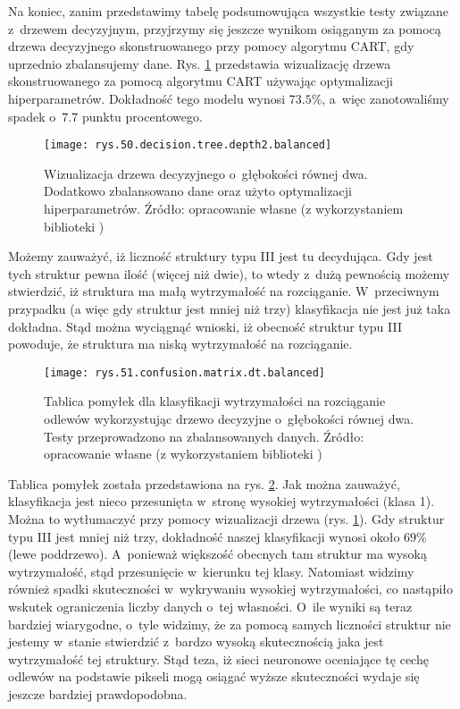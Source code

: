 Na koniec, zanim przedstawimy tabelę podsumowująca wszystkie testy związane z~drzewem decyzyjnym, przyjrzymy się jeszcze wynikom osiąganym za pomocą drzewa decyzyjnego skonstruowanego przy pomocy algorytmu CART, gdy uprzednio zbalansujemy dane. 
Rys. \ref{rys.50.decision.tree.depth2.balanced} przedstawia wizualizację drzewa skonstruowanego za pomocą algorytmu CART używając optymalizacji hiperparametrów. Dokładność tego modelu wynosi $73.5\%$, a~więc zanotowaliśmy spadek o~$7.7$ punktu procentowego. 
\begin{figure}[h]
    \centering
    \texttt{[image: rys.50.decision.tree.depth2.balanced]}
    \caption{Wizualizacja drzewa decyzyjnego o~głębokości równej dwa. Dodatkowo zbalansowano dane oraz użyto optymalizacji hiperparametrów. Źródło: opracowanie własne (z wykorzystaniem biblioteki )}
    \label{rys.50.decision.tree.depth2.balanced}
\end{figure}
Możemy zauważyć, iż liczność struktury typu III jest tu decydująca. Gdy jest tych struktur pewna ilość (więcej niż dwie), to wtedy z~dużą pewnością możemy stwierdzić, iż struktura ma małą wytrzymałość na rozciąganie. W~przeciwnym przypadku (a więc gdy struktur jest mniej niż trzy) klasyfikacja nie jest już taka dokładna. Stąd można wyciągnąć wnioski, iż obecność struktur typu III powoduje, że struktura ma niską wytrzymałość na rozciąganie.
\begin{figure}[h]
    \centering
    \texttt{[image: rys.51.confusion.matrix.dt.balanced]}
    \caption{Tablica pomyłek dla klasyfikacji wytrzymałości na rozciąganie odlewów wykorzystując drzewo decyzyjne o~głębokości równej dwa. Testy przeprowadzono na zbalansowanych danych. Źródło: opracowanie własne (z wykorzystaniem biblioteki )}
    \label{rys.51.confusion.matrix.dt.balanced}
\end{figure}
Tablica pomyłek została przedstawiona na rys. \ref{rys.51.confusion.matrix.dt.balanced}. Jak można zauważyć, klasyfikacja jest nieco przesunięta w~stronę wysokiej wytrzymałości (klasa 1). Można to wytłumaczyć przy pomocy wizualizacji drzewa (rys. \ref{rys.50.decision.tree.depth2.balanced}). Gdy struktur typu III jest mniej niż trzy, dokładność naszej klasyfikacji wynosi około $69\%$ (lewe poddrzewo). A~ponieważ większość obecnych tam struktur ma wysoką wytrzymałość, stąd przesunięcie w~kierunku tej klasy. Natomiast widzimy również spadki skuteczności w~wykrywaniu wysokiej wytrzymałości, co nastąpiło wskutek ograniczenia liczby danych o~tej własności. O~ile wyniki są teraz bardziej wiarygodne, o~tyle widzimy, że za pomocą samych liczności struktur nie jestemy w~stanie stwierdzić z~bardzo wysoką skutecznością jaka jest wytrzymałość tej struktury. Stąd teza, iż sieci neuronowe oceniające tę cechę odlewów na podstawie pikseli mogą osiągać wyższe skuteczności wydaje się jeszcze bardziej prawdopodobna. 

